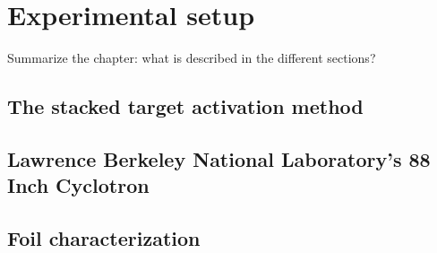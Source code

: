 \chapter{Experimental setup}
\label{experimental}
Summarize the chapter: what is described in the different sections?


\section{The stacked target activation method}
\section{Lawrence Berkeley National Laboratory's 88 Inch Cyclotron}
\section{Foil characterization}


